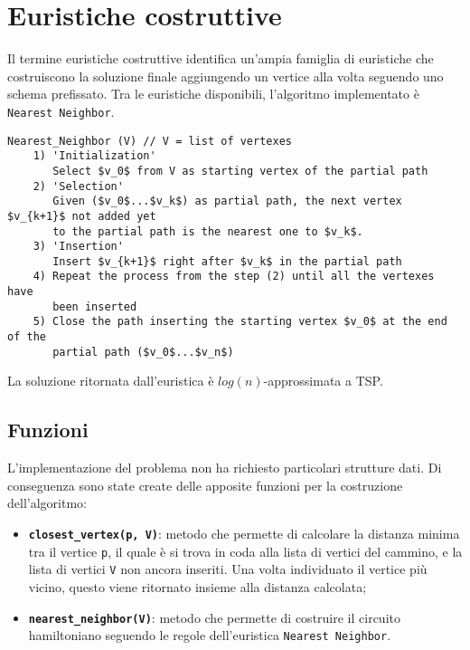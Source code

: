 \section{Euristiche costruttive}\label{constructive_heuristic}

Il termine euristiche costruttive identifica un'ampia famiglia di euristiche che costruiscono la soluzione finale aggiungendo un vertice alla volta seguendo uno schema prefissato. Tra le euristiche disponibili, l'algoritmo implementato è \texttt{Nearest Neighbor}. 

\begin{lstlisting}[mathescape=true]
Nearest_Neighbor (V) // V = list of vertexes
	1) 'Initialization'
	   Select $v_0$ from V as starting vertex of the partial path
	2) 'Selection'
	   Given ($v_0$...$v_k$) as partial path, the next vertex $v_{k+1}$ not added yet 
	   to the partial path is the nearest one to $v_k$. 
	3) 'Insertion'
	   Insert $v_{k+1}$ right after $v_k$ in the partial path
	4) Repeat the process from the step (2) until all the vertexes have
	   been inserted
	5) Close the path inserting the starting vertex $v_0$ at the end of the
	   partial path ($v_0$...$v_n$)
\end{lstlisting}

La soluzione ritornata dall'euristica è $log(n)$-approssimata a TSP.

\subsection{Funzioni}
L'implementazione del problema non ha richiesto particolari strutture dati. Di conseguenza sono state create delle apposite funzioni per la costruzione dell'algoritmo:
\begin{itemize}
	\item \texttt{\textbf{closest\_vertex(p, V)}}: metodo che permette di calcolare la distanza minima tra il vertice \texttt{p}, il quale è si trova in coda alla lista di vertici del cammino, e la lista di vertici \texttt{V} non ancora inseriti. Una volta individuato il vertice più vicino, questo viene ritornato insieme alla distanza calcolata;
	\item \texttt{\textbf{nearest\_neighbor(V)}}: metodo che permette di costruire il circuito hamiltoniano seguendo le regole dell'euristica \texttt{Nearest Neighbor}. 
\end{itemize}

